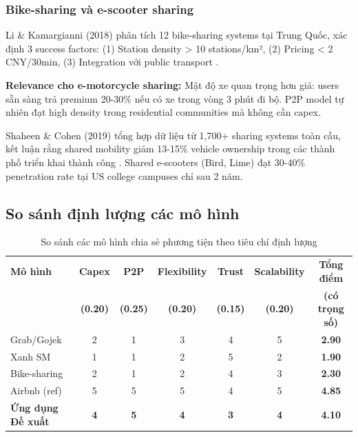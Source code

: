 \subsubsection{Bike-sharing và e-scooter sharing}

Li \& Kamargianni (2018) phân tích 12 bike-sharing systems tại Trung Quốc, xác định 3 success factors: (1) Station density > 10 stations/km², (2) Pricing < 2 CNY/30min, (3) Integration với public transport \cite{li2018}.

\textbf{Relevance cho e-motorcycle sharing:} Mật độ xe quan trọng hơn giá: users sẵn sàng trả premium 20-30\% nếu có xe trong vòng 3 phút đi bộ. P2P model tự nhiên đạt high density trong residential communities mà không cần capex.

Shaheen \& Cohen (2019) tổng hợp dữ liệu từ 1,700+ sharing systems toàn cầu, kết luận rằng shared mobility giảm 13-15\% vehicle ownership trong các thành phố triển khai thành công \cite{shaheen2019}. Shared e-scooters (Bird, Lime) đạt 30-40\% penetration rate tại US college campuses chỉ sau 2 năm.

\subsection{So sánh định lượng các mô hình}

\begin{table}[h]
\centering
\caption{So sánh các mô hình chia sẻ phương tiện theo tiêu chí định lượng}
\small
\begin{tabular}{|p{2.5cm}|c|c|c|c|c|c|}
\hline
\textbf{Mô hình} & \textbf{Capex} & \textbf{P2P} & \textbf{Flexibility} & \textbf{Trust} & \textbf{Scalability} & \textbf{Tổng điểm} \\
 & \textbf{(0.20)} & \textbf{(0.25)} & \textbf{(0.20)} & \textbf{(0.15)} & \textbf{(0.20)} & \textbf{(có trọng số)} \\
\hline
Grab/Gojek & 2 & 1 & 3 & 4 & 5 & \textbf{2.90} \\
\hline
Xanh SM & 1 & 1 & 2 & 5 & 2 & \textbf{1.90} \\
\hline
Bike-sharing & 2 & 1 & 2 & 4 & 3 & \textbf{2.30} \\
\hline
Airbnb (ref) & 5 & 5 & 5 & 4 & 5 & \textbf{4.85} \\
\hline
\textbf{Ứng dụng \newline Đề xuất} & \textbf{4} & \textbf{5} & \textbf{4} & \textbf{3} & \textbf{4} & \textbf{4.10} \\
\hline
\end{tabular}
\end{table}

